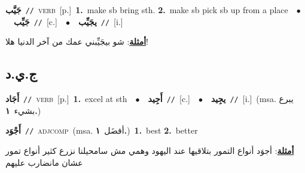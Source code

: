 \documentclass[10pt,a4paper,twoside]{article} %
\begin{document}
\begin{multicols}{2}
{\setlength\topsep{0pt}\textbf{\foreignlanguage{arabic}{جَيَّب}}\ {\color{gray}\texttt{//}\color{black}}\ \textsc{verb}\ [p.]\ \textbf{1.}~make sb bring sth.  \textbf{2.}~make sb pick sb up from a place\ \ $\bullet$\ \ \setlength\topsep{0pt}\textbf{\foreignlanguage{arabic}{جَيِّب}}\ {\color{gray}\texttt{//}\color{black}}\ [c.]\ \ $\bullet$\ \ \setlength\topsep{0pt}\textbf{\foreignlanguage{arabic}{يجَيِّب}}\ {\color{gray}\texttt{//}\color{black}}\ [i.]\  \begin{flushright}\color{gray}\foreignlanguage{arabic}{\textbf{\underline{\foreignlanguage{arabic}{أمثلة}}}: شو بيجَيِّبني عمك من آخر الدنيا هلا!}\end{flushright}\color{black}} \vspace{2mm}

\vspace{-3mm}
\subsection*{\color{blue}\foreignlanguage{arabic}{ج.ي.د}\color{blue}{}} 

{\setlength\topsep{0pt}\textbf{\foreignlanguage{arabic}{أَجَاد}}\ {\color{gray}\texttt{//}\color{black}}\ \textsc{verb}\ [p.]\ \textbf{1.}~excel at sth\ \ $\bullet$\ \ \setlength\topsep{0pt}\textbf{\foreignlanguage{arabic}{أَجِيد}}\ {\color{gray}\texttt{//}\color{black}}\ [c.]\ \ $\bullet$\ \ \setlength\topsep{0pt}\textbf{\foreignlanguage{arabic}{يجِيد}}\ {\color{gray}\texttt{//}\color{black}}\ [i.]\ \color{gray}(msa. \foreignlanguage{arabic}{يبرع بشيء}~\foreignlanguage{arabic}{\textbf{١.}})\color{black}\ } \vspace{2mm}

{\setlength\topsep{0pt}\textbf{\foreignlanguage{arabic}{أَجْوَد}}\ {\color{gray}\texttt{//}\color{black}}\ \textsc{adj\textunderscore comp}\ \color{gray}(msa. \foreignlanguage{arabic}{أفضَل}~\foreignlanguage{arabic}{\textbf{١.}})\color{black}\ \textbf{1.}~best  \textbf{2.}~better\  \begin{flushright}\color{gray}\foreignlanguage{arabic}{\textbf{\underline{\foreignlanguage{arabic}{أمثلة}}}: أجوَد أنواع التمور بتلاقيها عند اليهود وهمي مش سامحيلنا نزرع كثير أنواع تمور عشان مانضارب عليهم}\end{flushright}\color{black}} \vspace{2mm}


\end{multicols}
\end{document}
